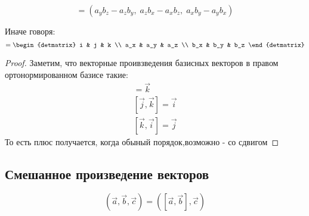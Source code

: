 \documentclass[12pt, a4paper]{article}
\begin{document}
    \begin{theorem}
        \begin{equation}
            [{\vec {a}},\;{\vec {b}}]=(a_{y}b_{z}-a_{z}b_{y},\;a_{z}b_{x}-a_{x}b_{z},\;a_{x}b_{y}-a_{y}b_{x})
        \end{equation}
        
        Иначе говоря: 
        \begin{equation}
            [{\vec {a}},\;{\vec {b}}] = \begin{detmatrix}
                i & j & k \\
                a_x & a_y & a_z \\
                b_x & b_y & b_z
            \end{detmatrix}
        \end{equation}
                
    \end{theorem}
    \begin{proof}
        Заметим, что векторные проивзведения базисных векторов в правом ортонормированном базисе такие:
        \begin{gather}
            [\vec{i}, \vec{j}] = \vec{k} \\ 
            [\vec{j}, \vec{k}] = \vec{i} \\
            [\vec{k}, \vec{i}] = \vec{j}
        \end{gather}
        То есть плюс получается, когда обыный порядок,возможно - со сдвигом
        
    \end{proof}


    \subsection{Смешанное произведение векторов}

    \begin{definition}
        \begin{equation}
            (\vec{a}, \vec{b}, \vec{c}) = ([\vec{a}, \vec{b}], \vec{c})
        \end{equation}
    \end{definition}
    
\end{document}
